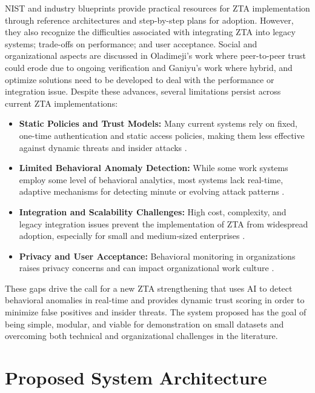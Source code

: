 \documentclass[conference]{IEEEtran}
\begin{document}
NIST and industry blueprints \cite{paper12,paper13} provide practical resources for ZTA implementation through reference architectures and step-by-step plans for adoption. However, they also recognize the difficulties associated with integrating ZTA into legacy systems; trade-offs on performance; and user acceptance. Social and organizational aspects are discussed in Oladimeji's work \cite{paper14} where peer-to-peer trust could erode due to ongoing verification and Ganiyu's work \cite{paper15} where hybrid, and optimize solutions need to be developed to deal with the performance or integration issue.
Despite these advances, several limitations persist across current ZTA implementations:
\begin{itemize}
    \item \textbf{Static Policies and Trust Models:} Many current systems rely on fixed, one-time authentication and static access policies, making them less effective against dynamic threats and insider attacks \cite{paper2,paper8,paper10}.
    \item \textbf{Limited Behavioral Anomaly Detection:} While some work systems employ some level of behavioral analytics, most systems lack real-time, adaptive mechanisms for detecting minute or evolving attack patterns \cite{paper2,paper6,paper8, paper11}.
    \item \textbf{Integration and Scalability Challenges:} High cost, complexity, and legacy integration issues prevent the implementation of ZTA from widespread adoption, especially for small and medium-sized enterprises \cite{paper5,paper10,paper12,paper15}.
    \item \textbf{Privacy and User Acceptance:} Behavioral monitoring in organizations raises privacy concerns and can impact organizational work culture \cite{paper2,paper8,paper14}.
\end{itemize}

These gaps drive the call for a new ZTA strengthening that uses AI to detect behavioral anomalies in real-time and provides dynamic trust scoring in order to minimize false positives and insider threats. The system proposed has the goal of being simple, modular, and viable for demonstration on small datasets and overcoming both technical and organizational challenges in the literature.

\section{Proposed System Architecture}
\end{document}
